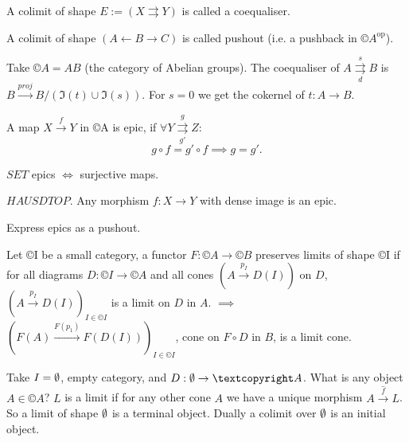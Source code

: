\documentclass[12pt]{article}					%
\newcommand{\op}{^{\text{op}}}
\begin{document}
\begin{priklady}[Coequaliser]
	A colimit of shape $E := (X \rightrightarrows Y)$ is called a coequaliser.
\end{priklady}

\begin{priklady}[Pushout]
	A colimit of shape $(A \leftarrow B \rightarrow C)$ is called pushout (i.e. a pushback in $©A\op$).
\end{priklady}

\begin{priklady}
	Take $©A = AB$ (the category of Abelian groups). The coequaliser of $A \overset{s}{\underset{d}\rightrightarrows} B$ is $B \overset{proj}\rightarrow B / (\Im(t) \cup \Im(s))$. For $s = 0$ we get the cokernel of $t: A \rightarrow B$.
\end{priklady}

\begin{definice}[Epics]
	A map $X \overset{f}\rightarrow Y$ in ©A is epic, if $\forall Y \overset{g}{\underset{g'}\rightrightarrows} Z$:
	$$ g ∘ f = g'∘f \implies g = g'. $$
\end{definice}

\begin{priklady}
	$SET$ epics $\Leftrightarrow$ surjective maps.

	$HAUSD TOP$. Any morphism $f: X \rightarrow Y$ with dense image is an epic.
\end{priklady}

\begin{priklad}
	Express epics as a pushout.
\end{priklad}

\begin{definice}
	Let ©I be a small category, a functor $F: ©A \rightarrow ©B$ preserves limits of shape ©I if for all diagrams $D: ©I \rightarrow ©A$ and all cones $(A \overset{p_I}\rightarrow D(I))$ on $D$, $(A \overset{p_I}\rightarrow D(I))_{I \in ©I}$ is a limit on $D$ in $A$. $\implies$ $(F(A) \overset{F(p_1)}\rightarrow F(D(I)))_{I \in ©I}$, cone on $F ∘ D$ in $B$, is a limit cone.
\end{definice}

\begin{priklady}
	Take $I = \emptyset$, empty category, and $D: \O \rightarrow ©A$. What is any object $A \in ©A$? $L$ is a limit if for any other cone $A$ we have a unique morphism $A \overset{\hat{f}}\rightarrow L$. So a limit of shape $\emptyset$ is a terminal object. Dually a colimit over $\emptyset$ is an initial object.
\end{priklady}
\end{document}
